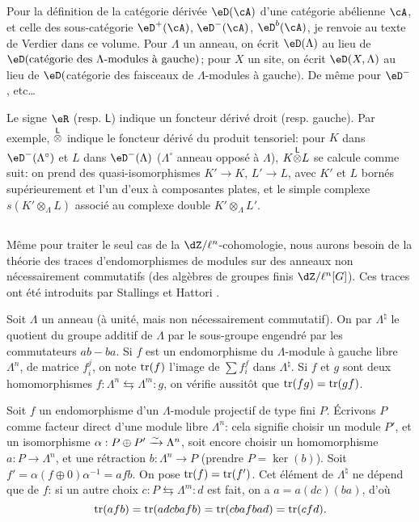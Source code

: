 \subsection{}\label{II:4-1}

Pour la définition de la catégorie dérivée $\eD(\cA)$ d'une catégorie 
abélienne $\cA$, et celle des sous-catégorie $\eD^+(\cA)$, $\eD^-(\cA)$, 
$\eD^b(\cA)$, je renvoie au texte de Verdier dans ce volume. Pour $\Lambda$ 
un anneau, on écrit $\eD(\Lambda)$ au lieu de 
$\eD(\text{catégorie des $\Lambda$-modules à gauche})$; pour $X$ un site, on 
écrit $\eD(X,\Lambda)$ au lieu de 
$\eD($catégorie des faisceaux de $\Lambda$-modules à gauche$)$. De 
même pour $\eD^-$, etc\ldots

Le signe $\eR$ (resp. $\mathsf{L}$) indique un foncteur dérivé droit (resp. 
gauche). Par exemple, ${\overset{\mathsf{L}}{\otimes}}$ indique le foncteur dérivé du produit 
tensoriel: pour $K$ dans $\eD^-(\Lambda^\circ)$ et $L$ dans $\eD^-(\Lambda)$ 
($\Lambda^\circ$ anneau opposé à $\Lambda$), $K{\overset{\mathsf{L}}{\otimes}} L$ se calcule 
comme suit: on prend des quasi-isomorphismes $K'\to K$, $L'\to L$, avec 
$K'$ et $L$ bornés supérieurement et l'un d'eux à composantes plates, et 
le simple complexe $s(K'\otimes_\Lambda L)$ associé au complexe double 
$K'\otimes_\Lambda L'$. 





\subsection{}\label{II:4-2}

Même pour traiter le seul cas de la $\dZ/\ell^n$-cohomologie, nous aurons 
besoin de la théorie des traces d'endomorphismes de modules sur des anneaux 
non nécessairement commutatifs (des algèbres de groupes finis 
$\dZ/\ell^n[G]$). Ces traces ont été introduits par Stallings et Hattori 
\cite{ba76}. 

Soit $\Lambda$ un anneau (à unité, mais non nécessairement commutatif). 
On par $\Lambda^\natural$ le quotient du groupe additif de $\Lambda$ par le 
sous-groupe engendré par les commutateurs $a b - b a$. Si $f$ est un 
endomorphisme du $\Lambda$-module à gauche libre $\Lambda^n$, de matrice 
$f_i^j$, on note $\operatorname{tr}(f)$ l'image de $\sum f_i^f$ dans $\Lambda^\natural$. 
Si $f$ et $g$ sont deux homomorphismes 
$f:\Lambda^n \leftrightarrows \Lambda^m : g$, on vérifie aussitôt que 
$\operatorname{tr}(f g) = \operatorname{tr}(g f)$. 

Soit $f$ un endomorphisme d'un $\Lambda$-module projectif de type fini $P$. 
Écrivons $P$ comme facteur direct d'une module libre $\Lambda^n$: cela signifie 
choisir un module $P'$, et un isomorphisme $\alpha:P\oplus P'\xrightarrow\sim \Lambda^n$, 
soit encore choisir un homomorphisme $a:P\to \Lambda^n$, et une rétraction 
$b:\Lambda^n\to P$ (prendre $P=\ker(b)$). Soit 
$f'=\alpha(f\oplus 0)\alpha^{-1} =af b$. On pose $\operatorname{tr}(f) = \operatorname{tr}(f')$. Cet 
élément de $\Lambda^\natural$ ne dépend que de $f$: si un autre choix 
$c:P\leftrightarrows \Lambda^m:d$ est fait, on a $a=a(dc)(ba)$, d'où 
\[
 \operatorname{tr}(a f b) = \operatorname{tr}(adcbafb) = \operatorname{tr}(cbafbad) = \operatorname{tr}(cfd) \text{.}
\]

